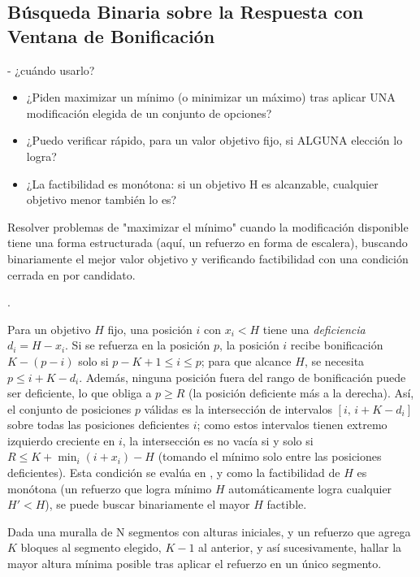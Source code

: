\subsection{Búsqueda Binaria sobre la Respuesta con Ventana de Bonificación}

 - ¿cuándo usarlo?

\begin{itemize}
\item ¿Piden maximizar un mínimo (o minimizar un máximo) tras aplicar UNA modificación elegida de un conjunto de opciones?
\item ¿Puedo verificar rápido, para un valor objetivo fijo, si ALGUNA elección lo logra?
\item ¿La factibilidad es monótona: si un objetivo H es alcanzable, cualquier objetivo menor también lo es?
\end{itemize}

 Resolver problemas de "maximizar el mínimo" cuando la modificación disponible tiene una forma estructurada (aquí, un refuerzo en forma de escalera), buscando binariamente el mejor valor objetivo y verificando factibilidad con una condición cerrada en  por candidato.

 .

 Para un objetivo $H$ fijo, una posición $i$ con $x_i < H$ tiene una \emph{deficiencia} $d_i = H - x_i$. Si se refuerza en la posición $p$, la posición $i$ recibe bonificación $K-(p-i)$ solo si $p-K+1 \le i \le p$; para que alcance $H$, se necesita $p \le i + K - d_i$. Además, ninguna posición fuera del rango de bonificación puede ser deficiente, lo que obliga a $p \ge R$ (la posición deficiente más a la derecha). Así, el conjunto de posiciones $p$ válidas es la intersección de intervalos $[i,\, i+K-d_i]$ sobre todas las posiciones deficientes $i$; como estos intervalos tienen extremo izquierdo creciente en $i$, la intersección es no vacía si y solo si $R \le K + \min_i(i + x_i) - H$ (tomando el mínimo solo entre las posiciones deficientes). Esta condición se evalúa en , y como la factibilidad de $H$ es monótona (un refuerzo que logra mínimo $H$ automáticamente logra cualquier $H' < H$), se puede buscar binariamente el mayor $H$ factible.


Dada una muralla de N segmentos con alturas iniciales, y un refuerzo que agrega $K$ bloques al segmento elegido, $K-1$ al anterior, y así sucesivamente, hallar la mayor altura mínima posible tras aplicar el refuerzo en un único segmento.

